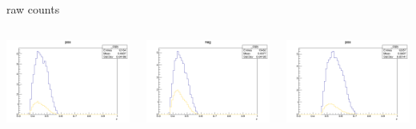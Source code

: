 \begin{frame}{raw counts}
\begin{columns}
\begin{column}[T]{0.25\textwidth}
\includegraphics[width = \textwidth]{results/yield/statistics/yield_x_Q2_z_0.55_5.500_0.45_pos.png}
\end{column}
\begin{column}[T]{0.25\textwidth}
\includegraphics[width = \textwidth]{results/yield/statistics/yield_x_Q2_z_0.55_5.500_0.45_neg.png}
\end{column}
\begin{column}[T]{0.25\textwidth}
\includegraphics[width = \textwidth]{results/yield/statistics/yield_x_Q2_z_0.55_5.500_0.55_pos.png}

\end{column}
\end{columns}
\end{frame}
